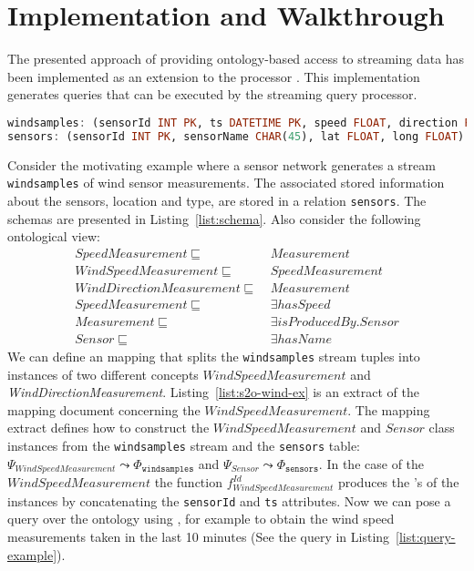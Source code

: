\section{Implementation and Walkthrough}
\label{execution}

The presented approach of providing ontology-based access to streaming data has been implemented as an extension to the \odemapster processor \cite{Barrasa_04}. 
This implementation generates \sneeql queries that can be executed by the streaming query processor.

\begin{lstlisting}[style=SNEEqlStyle,language=Haskell,label=list:schema,caption=Relational schema of the data source.]
windsamples: (sensorId INT PK, ts DATETIME PK, speed FLOAT, direction FLOAT)
sensors: (sensorId INT PK, sensorName CHAR(45), lat FLOAT, long FLOAT)
\end{lstlisting}

Consider the motivating example where a sensor network generates a stream \texttt{windsamples} of wind sensor measurements.
The associated stored information about the sensors, \eg location and type, are stored in a relation \texttt{sensors}.
The schemas are presented in Listing~\ref{list:schema}. Also consider the following ontological view:
\vspace{-10pt}
\small
\begin{align*}%
SpeedMeasurement \sqsubseteq\ & Measurement \\
WindSpeedMeasurement \sqsubseteq\ & SpeedMeasurement \\
WindDirectionMeasurement \sqsubseteq\ & Measurement \\
SpeedMeasurement \sqsubseteq\ & \exists hasSpeed \\
Measurement \sqsubseteq\ & \exists isProducedBy.Sensor \\
Sensor \sqsubseteq\ & \exists hasName
\end{align*}
\normalsize
We can define an \stwoo mapping that splits the \texttt{windsamples} stream tuples into instances of two different concepts $WindSpeedMeasurement$ and \textit{WindDirectionMeasurement}. 
Listing~\ref{list:s2o-wind-ex} is an extract of the \stwoo mapping document concerning the $WindSpeedMeasurement$.
The mapping extract defines how to construct the $WindSpeedMeasurement$ and $Sensor$ class instances from the \texttt{windsamples} stream and the \texttt{sensors} table: $\Psi_{WindSpeedMeasurement}\leadsto \Phi_{\mathtt{windsamples}}$ and $\Psi_{Sensor}\leadsto \Phi_{\mathtt{sensors}}$. 
In the case of the $WindSpeedMeasurement$ the function $f_{WindSpeedMeasurement}^{Id}$ produces the \uri's of the instances by concatenating the \texttt{sensorId} and \texttt{ts} attributes.
Now we can pose a query over the ontology using \sparqlstr, for example to obtain the wind speed measurements taken in the last 10 minutes (See the query in Listing~\ref{list:query-example}).

